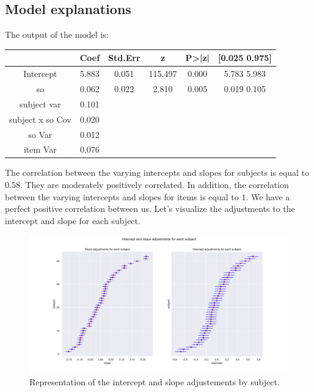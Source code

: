 \documentclass{article}
\begin{document}
\subsection{Model explanations}
The output of the model is:
\begin{center}
    \begin{tabular}{|c|c|c|c|c|c|}
    \hline
         & Coef & Std.Err & z & P>|z| & [0.025 0.975]  \\
         \hline \hline
        Intercept & 5.883 & 0.051 & 115.497 & 0.000 & 5.783 5.983\\
         so & 0.062 & 0.022 & 2.810 & 0.005 & 0.019 0.105 \\
         subject var &  0.101 &  &  & & \\
         subject x so Cov & 0.020 &  & & &\\
         so Var & 0.012 &  & & &\\
         item Var & 0.076 & & & &\\
         \hline
    \end{tabular}
\end{center}

The correlation between the varying intercepts and slopes for subjects is equal to $0.58$. They are moderately positively correlated.
In addition, the correlation between the varying intercepts and slopes for items is equal to $1$. We have a perfect positive correlation between us.
Let's visualize the adjustments to the intercept and slope for each subject.

\begin{figure}[H]
    \centering
    \includegraphics[scale=.42]{./images/model3_inter.pdf}
    \caption{Representation of the intercept and slope adjustements by subject.}
    \label{fig:model3}
\end{figure}
\end{document}
